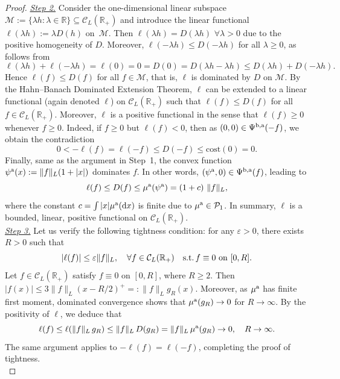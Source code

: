 \documentclass[11pt]{article}
\newcommand{\cC}{\mathcal{C}}
\newcommand{\cP}{\mathcal{P}}
\newcommand{\R}{\mathbb{R}} %
\newcommand{\vae}{\varepsilon}
\theoremstyle{plain}
\theoremstyle{definition}
\theoremstyle{remark}
\newcommand*{\rd}{\mathrm{d}}
\theoremstyle{plain}
\begin{document}
\begin{proof}
\underline{\textit{Step 2.}} Consider the one-dimensional linear subspace $\mathcal{M}:=\{\lambda h : \lambda \in \R\} \subseteq \cC_L(\R_+)$ and introduce the linear functional  $\ell(\lambda h) := \lambda D(h)$ on~$\mathcal{M}$. 
Then $\ell(\lambda h) = D(\lambda h)$ $\forall \lambda > 0$ due to the positive homogeneity of $D$. Moreover,  $\ell(-\lambda h) \le D(-\lambda h)$ for all $\lambda \ge 0$, as follows from 
$$\ell(\lambda h) + \ell(-\lambda h) = \ell(0) = 0 = D(0) = D(\lambda h - \lambda h) \le D(\lambda h) + D(- \lambda h). $$
Hence $\ell(f) \le D(f)$ for all  $f \in \mathcal{M}$, that is, $\ell$ is dominated by $D$ on $\mathcal{M}$. By the Hahn--Banach Dominated Extension Theorem, $\ell$ can be extended to a linear functional (again denoted $\ell$) on $\cC_L(\R_+)$ such that   $\ell(f) \le D(f)$  for all $f\in \cC_L(\R_+)$. %
Moreover, $\ell$ is a positive functional in the sense that $\ell(f) \ge 0$ whenever $f \ge 0$. Indeed, if $f\ge 0$ but $\ell(f)<0$, then as $(0,0)\in \Psi^{\rm{b,a}}(-f)$, we obtain the contradiction
$$0 < -\ell(f) = \ell(-f) \le D(-f) \le \text{cost}(0) = 0.$$
Finally, same as the argument in Step~1, the convex function 
 $\psi^{\rm a}(x) :=  \lVert f \rVert_{L}(1 + |x|)$ dominates $f$. In other words,   $(\psi^{\rm a}, 0) \in \Psi^{\rm{b,a}}(f)$, leading to 
$$\ell(f) \le D(f) \le \mu^{\rm{a}}(\psi^{\rm a}) =  (1+c)\ \lVert f \rVert_{L} ,$$%
where the constant $c =   \int |x|\mu^{\rm{a}}(\rd x)$ is finite due to $\mu^{\rm{a}} \in \cP_1$. In summary, $\ell$ is a bounded, linear, positive functional on $\cC_L(\R_+)$.  \\[-0.75em] 
%
%

\underline{\textit{Step 3.}} Let us verify the following tightness condition: for any $\vae >0$, there exists $R>0$ such that 
\[
|\ell(f)|\leq \vae \|f\|_L,\quad \forall f\in \cC_L(\R_+) \quad {\rm s.t.}\, f \equiv 0 \,\,{\rm on} \,\,[0,R].
\]
Let $f \in \cC_L(\R_+)$ satisfy $f \equiv 0$ on $[0,R]$, where $R\geq2$. Then $|f(x)|
%
\leq 3\|f\|_L(x-R/2)^+ =: \|f\|_L g_R(x)$. Moreover, as $\mu^{\rm a}$ has finite first moment, dominated convergence shows that $\mu^{\rm a}(g_R)\to 0$ for $R\to \infty$. By the positivity of $\ell$, we deduce that 
\[
\ell(f) \leq  \ell(\|f\|_L\,g_R) \leq \|f\|_L\, D(g_R) =  \|f\|_L\,\mu^{\rm a}(g_R)\to 0,\quad R\to \infty.
\]
The same argument applies to $-\ell(f)=\ell(-f)$, completing the proof of tightness.\\[-0.75em] 


\end{proof}
\end{document}
